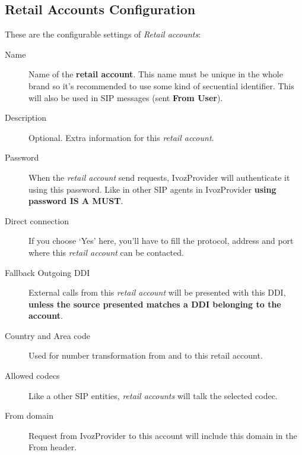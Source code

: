 \documentclass[letterpaper,10pt,english]{sphinxmanual}
\begin{document}
\subsection{Retail Accounts Configuration}
\label{retail/retail_accounts:retail-accounts-configuration}
These are the configurable settings of \emph{Retail accounts}:
\begin{description}
\item[{Name}] \leavevmode{}\label{retail/retail_accounts:term-name}
Name of the \textbf{retail account}. This name must be unique in the whole brand so
it's recommended to use some kind of secuential identifier. This will also be used
in SIP messages (sent \textbf{From User}).

\item[{Description}] \leavevmode{}\label{retail/retail_accounts:term-description}
Optional. Extra information for this \emph{retail account}.

\item[{Password}] \leavevmode{}\label{retail/retail_accounts:term-password}
When the \emph{retail account} send requests, IvozProvider will authenticate it using
this password. Like in other SIP agents in IvozProvider \textbf{using password IS A MUST}.

\item[{Direct connection}] \leavevmode{}\label{retail/retail_accounts:term-direct-connection}
If you choose `Yes' here, you'll have to fill the protocol, address and
port where this \emph{retail account} can be contacted.

\item[{Fallback Outgoing DDI}] \leavevmode{}\label{retail/retail_accounts:term-fallback-outgoing-ddi}
External calls from this \emph{retail account} will be presented with this DDI, \textbf{unless
the source presented matches a DDI belonging to the account}.

\item[{Country and Area code}] \leavevmode{}\label{retail/retail_accounts:term-country-and-area-code}
Used for number transformation from and to this retail account.

\item[{Allowed codecs}] \leavevmode{}\label{retail/retail_accounts:term-allowed-codecs}
Like a other SIP entities, \emph{retail accounts} will talk the selected codec.

\item[{From domain}] \leavevmode{}\label{retail/retail_accounts:term-from-domain}
Request from IvozProvider to this account will include this domain in
the From header.

\end{description}
\end{document}
